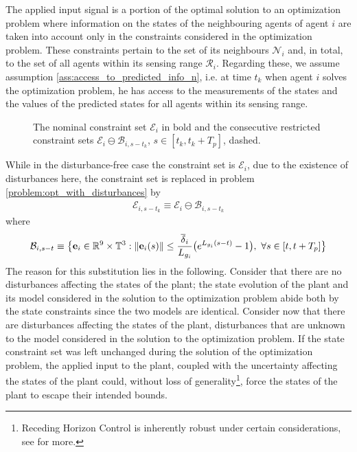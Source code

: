 The applied input signal is a portion of the optimal solution to an
optimization problem where information on the states of the neighbouring agents
of agent $i$ are taken into account only in the constraints considered in the
optimization problem. These constraints pertain to the set of its neighbours
$\mathcal{N}_i$ and, in total, to the set of all agents within its sensing
range $\mathcal{R}_i$. Regarding these, we assume assumption
\eqref{ass:access_to_predicted_info_n}, i.e. at time $t_k$ when agent $i$
solves the optimization problem, he has access to the measurements of the states
and the values of the predicted states for all agents within its sensing range.



\begin{figure}[ht!]
  \centering
  
  \caption{The nominal constraint set $\mathcal{E}_i$ in bold and the
    consecutive restricted constraint sets $\mathcal{E}_i \ominus \mathcal{B}_{i, s-t_k}$,
    $s \in [t_k, t_k + T_p]$, dashed.}
\end{figure}

While in the disturbance-free case the constraint set is $\mathcal{E}_i$,
due to the existence of disturbances here, the constraint set is replaced in
problem \eqref{problem:opt_with_disturbances} by
\begin{align}
  \mathcal{E}_{i, s-t_k} \equiv \mathcal{E}_i \ominus \mathcal{B}_{i,s-t_k}
\label{eq:restricted_constraint_set}
\end{align}
where
\begin{align}
  \mathcal{B}_{i,s-t} \equiv \big\{ \bm{\mathbf{e}}_i \in \mathbb{R}^9 \times \mathbb{T}^3 :
    \|\bm{\mathbf{e}}_i(s)\| \leq \dfrac{\overline{\delta}_i}{L_{g_i}}\big( e^{L_{g_i}(s - t)} - 1\big),\ \forall s \in [t, t + T_p] \big\}
\label{eq:b_restricted_constraint_set}
\end{align}
The reason for this substitution lies in the following. Consider that there
are no disturbances affecting the states of the plant; the state evolution of
the plant and its model considered in the solution to the optimization problem
abide both by the state constraints since the two models are identical. Consider
now that there are disturbances affecting the states of the plant, disturbances
that are unknown to the model considered in the solution to the optimization
problem. If the state constraint set was left unchanged during the solution of
the optimization problem, the applied input to the plant, coupled with the
uncertainty affecting the states of the plant could, without loss of
generality\footnote{Receding Horizon Control is inherently robust
under certain considerations, see \cite{Fontes2007} for more.}, force the states
of the plant to escape their intended bounds.

